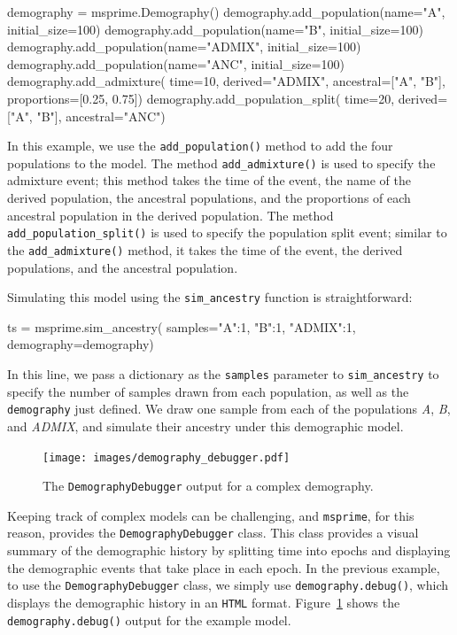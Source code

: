 \documentclass[graybox]{svmult}
\newcommand{\msprime}[0]{\texttt{msprime}}
\begin{document}
\begin{pythoncode}
    demography = msprime.Demography()
    demography.add_population(name="A", initial_size=100)
    demography.add_population(name="B", initial_size=100)
    demography.add_population(name="ADMIX", initial_size=100)
    demography.add_population(name="ANC", initial_size=100)
    demography.add_admixture(
        time=10, derived="ADMIX", ancestral=["A", "B"],
        proportions=[0.25, 0.75])
    demography.add_population_split(
        time=20, derived=["A", "B"], ancestral="ANC")
\end{pythoncode}

In this example, we use the \texttt{add\_population()} method to add the four populations
to the model. The method \texttt{add\_admixture()} is used to specify the admixture event;
this method takes the time of the event, the name of the derived population, the ancestral
populations, and the proportions of each ancestral population in the derived population.
The method \texttt{add\_population\_split()} is used to specify the population split event;
similar to the \texttt{add\_admixture()} method, it takes the time of the event, the derived
populations, and the ancestral population.

Simulating this model using the \texttt{sim\_ancestry} function is straightforward:
\begin{pythoncode}
ts = msprime.sim_ancestry(
    samples={"A":1, "B":1, "ADMIX":1}, demography=demography)
\end{pythoncode}
In this line, we pass a dictionary as the \texttt{samples} parameter to \texttt{sim\_ancestry} to
specify the number of samples drawn from each population, as well as the
\texttt{demography} just defined.
We draw one sample from each of the populations
\emph{A}, \emph{B}, and \emph{ADMIX}, and simulate their ancestry under this
demographic model.

\begin{figure}[t]
\centering
\texttt{[image: images/demography\_debugger.pdf]}
\caption{\label{fig:DemographyDebugger}The \texttt{DemographyDebugger} output for a complex demography.}
\end{figure}

\label{demography-debugger}
Keeping track of complex models can be challenging, and \msprime, for this reason,
provides the \texttt{DemographyDebugger} class. This class provides a visual summary of
the demographic history by splitting time into epochs and displaying the demographic
events that take place in each epoch. In the previous example, to use the \texttt{DemographyDebugger} class,
we simply use \texttt{demography.debug()}, which displays the demographic history in an \texttt{HTML}
format. Figure~\ref{fig:DemographyDebugger} shows the \texttt{demography.debug()} output
for the example model.
\end{document}
